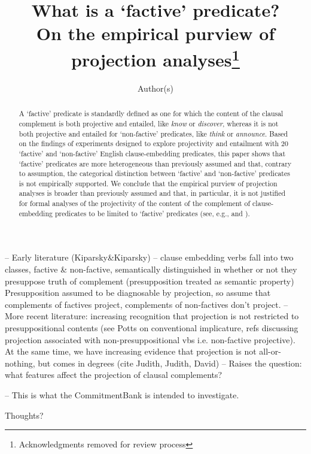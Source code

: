 \documentclass[11pt,fleqn]{article}
\title{What is a `factive' predicate? \\ On the empirical purview of projection analyses\thanks{Acknowledgments removed for review process}}
\author{Author(s)}
\newcommand{\6}{\mbox{$[\hspace*{-.6mm}[$}}
\newcommand{\9}{\mbox{$]\hspace*{-.6mm}]$}}
\begin{document}

\maketitle


\begin{abstract}

A `factive' predicate is standardly defined as one for which the content of the clausal complement is both projective and entailed, like {\em know} or {\em discover}, whereas it is not both projective and entailed for `non-factive' predicates, like {\em think} or {\em announce}. Based on the findings of experiments designed to explore projectivity and entailment with 20 `factive' and `non-factive' English clause-embedding predicates, this paper shows that `factive' predicates are more heterogeneous than previously assumed and that, contrary to assumption, the categorical distinction between `factive' and `non-factive' predicates is not empirically supported. We conclude that the empirical purview of projection analyses is broader than previously assumed and that, in particular, it is not justified for formal analyses of the projectivity of the content of the complement of clause-embedding predicates to be limited to `factive' predicates (see, e.g., \citealt{heim83,vds92,abrusan2011,abrusan2016,romoli2015} and \citealt{best-question}).


\end{abstract}

-- Early literature (Kiparsky&Kiparsky) -- clause embedding verbs fall into two classes, factive & non-factive, semantically distinguished in whether or not they presuppose truth of complement (presupposition treated as semantic property) Presupposition assumed to be diagnosable by projection, so assume that complements of factives project, complements of non-factives don't project. 
-- More recent literature: increasing recognition that projection is not restricted to presuppositional contents (see Potts on conventional implicature, refs discussing projection associated with non-presuppositional vbs i.e. non-factive projective). At the same time, we have increasing evidence that projection is not all-or-nothing, but comes in degrees (cite Judith, Judith, David)
-- Raises the question: what features affect the projection of clausal complements?

-- This is what the CommitmentBank is intended to investigate.

Thoughts?
\end{document}

